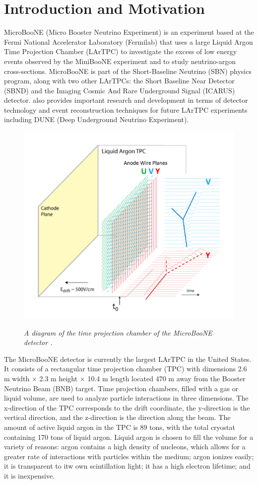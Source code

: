 \section{Introduction and Motivation}

MicroBooNE (Micro Booster Neutrino Experiment) is an experiment based at the Fermi National Accelerator Laboratory (Fermilab) that uses a large Liquid Argon Time Projection Chamber (LArTPC) to investigate the excess of low energy events observed by the MiniBooNE experiment \cite{Aguilar-Arevalo:2013pmq} and to study neutrino-argon cross-sections. MicroBooNE is part of the Short-Baseline Neutrino (SBN) physics program, along with two other LArTPCs: the Short Baseline Near Detector (SBND) and the Imaging Cosmic And Rare Underground Signal (ICARUS) detector. {\ub} also provides important research and development in terms of detector technology and event reconstruction techniques for future LArTPC experiments including DUNE (Deep Underground Neutrino Experiment).\\

\begin{figure}[ht!]
\centering
	\includegraphics[width=0.4\linewidth]{Figures/detector2.png} \\
\caption{\textit{A diagram of the time projection chamber of the MicroBooNE detector \cite{lartpc}.}}\label{detector_fig}
\end{figure}

The MicroBooNE detector is currently the largest LArTPC in the United States. It consists of a rectangular time projection chamber (TPC) with dimensions 2.6 m width $\times$ 2.3 m height $\times$ 10.4 m length located 470 m away from the Booster Neutrino Beam (BNB) target. Time projection chambers, filled with a gas or liquid volume, are used to analyze particle interactions in three dimensions. The x-direction of the TPC corresponds to the drift coordinate, the y-direction is the vertical direction, and the z-direction is the direction along the beam. The amount of active liquid argon in the TPC is 89 tons, with the total cryostat containing 170 tons of liquid argon. Liquid argon is chosen to fill the volume for a variety of reasons: argon contains a high density of nucleons, which allows for a greater rate of interactions with particles within the medium; argon ionizes easily; it is transparent to itw own scintillation light; it has a high electron lifetime; and it is inexpensive.\\

